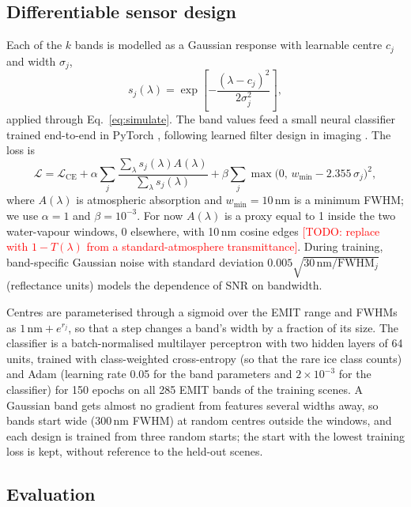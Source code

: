 \documentclass[11pt]{article}
\newcommand{\todo}[1]{\textnormal{\textcolor{red}{[TODO: #1]}}}
\newcommand{\nm}{\,nm}
\begin{document}
\subsection{Differentiable sensor design}
\label{sec:differentiable}
Each of the $k$ bands is modelled as a Gaussian response with learnable centre
$c_j$ and width $\sigma_j$,
\begin{equation}
  s_j(\lambda) = \exp\!\left[-\frac{(\lambda-c_j)^2}{2\sigma_j^2}\right],
  \label{eq:gaussian}
\end{equation}
applied through Eq.~\eqref{eq:simulate}. The band values feed a small neural
classifier trained end-to-end in PyTorch \citep{paszke2019}, following learned
filter design in imaging \citep{chakrabarti2016,nie2018}. The loss is
\begin{equation}
  \mathcal{L} = \mathcal{L}_\mathrm{CE}
    + \alpha \sum_j \frac{\sum_\lambda s_j(\lambda)A(\lambda)}{\sum_\lambda s_j(\lambda)}
    + \beta \sum_j \max\!\bigl(0,\, w_\mathrm{min} - 2.355\,\sigma_j\bigr)^2,
  \label{eq:loss}
\end{equation}
where $A(\lambda)$ is atmospheric absorption and $w_\mathrm{min}=10$\nm{} is a
minimum FWHM; we use $\alpha=1$ and $\beta=10^{-3}$. For now $A(\lambda)$ is a
proxy equal to 1 inside the two water-vapour windows, 0 elsewhere, with 10\nm{}
cosine edges \todo{replace with $1-T(\lambda)$ from a standard-atmosphere
transmittance}. During training, band-specific Gaussian noise with standard
deviation $0.005\sqrt{30\,\mathrm{nm}/\mathrm{FWHM}_j}$ (reflectance units)
models the dependence of SNR on bandwidth.

Centres are parameterised through a sigmoid over the EMIT range and FWHMs as
$1\,\mathrm{nm}+e^{r_j}$, so that a step changes a band's width by a fraction
of its size. The classifier is a batch-normalised multilayer perceptron with
two hidden layers of 64 units, trained with class-weighted cross-entropy (so
that the rare ice class counts) and Adam (learning rate 0.05 for the band
parameters and $2\times10^{-3}$ for the classifier) for 150 epochs on all 285
EMIT bands of the training scenes. A Gaussian band gets almost no gradient
from features several widths away, so bands start wide (300\nm{} FWHM) at
random centres outside the windows, and each design is trained from three
random starts; the start with the lowest training loss is kept, without
reference to the held-out scenes.

\subsection{Evaluation}
\label{sec:evaluation}
\end{document}
